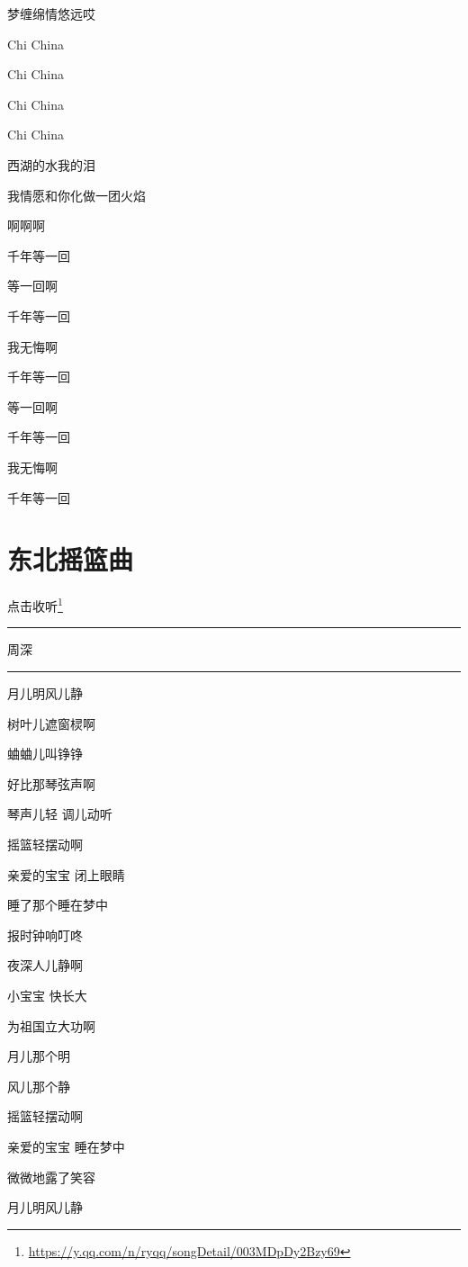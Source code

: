 \documentclass[]{ctexbook}
\renewcommand{\href}[2]{#2\footnote{\url{#1}}}
\begin{document}
梦缠绵情悠远哎

Chi China

Chi China

Chi China

Chi China

西湖的水我的泪

我情愿和你化做一团火焰

啊啊啊

千年等一回

等一回啊

千年等一回

我无悔啊

千年等一回

等一回啊

千年等一回

我无悔啊

千年等一回

\section*{东北摇篮曲}\label{lullaby}


\href{https://y.qq.com/n/ryqq/songDetail/003MDpDy2Bzy69}{点击收听}

\begin{center}\rule{0.5\linewidth}{0.5pt}\end{center}

周深

\begin{center}\rule{0.5\linewidth}{0.5pt}\end{center}

月儿明风儿静

树叶儿遮窗棂啊

蛐蛐儿叫铮铮

好比那琴弦声啊

琴声儿轻 调儿动听

摇篮轻摆动啊

亲爱的宝宝 闭上眼睛

睡了那个睡在梦中

报时钟响叮咚

夜深人儿静啊

小宝宝 快长大

为祖国立大功啊

月儿那个明

风儿那个静

摇篮轻摆动啊

亲爱的宝宝 睡在梦中

微微地露了笑容

月儿明风儿静
\end{document}

